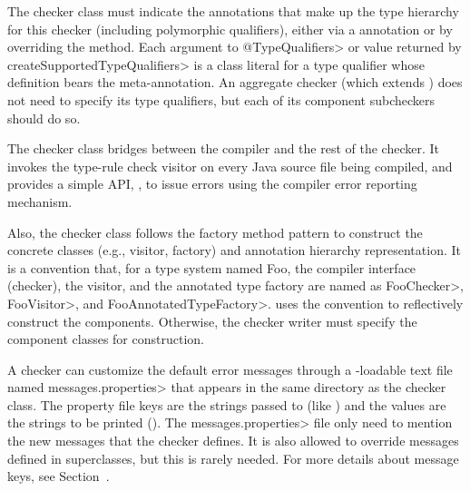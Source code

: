 The checker class must indicate the annotations
that make up the type hierarchy for this checker (including
polymorphic qualifiers), either via a
 annotation or by overriding
the
method.  Each argument to \<@TypeQualifiers> or value returned by
\<createSupportedTypeQualifiers> is a class literal for a type qualifier
whose definition bears the
 meta-annotation.
An aggregate checker (which extends
) does not need to specify its
type qualifiers, but each of its component subcheckers should do so.


The checker class bridges between the compiler and the rest of the checker.  It
invokes the type-rule check visitor on every Java source file being
compiled, and provides a simple API, , to issue
errors using the compiler error reporting mechanism.

Also, the checker class follows the factory method pattern to
construct the concrete classes (e.g., visitor, factory) and annotation
hierarchy representation.  It is a convention that, for
a type system named Foo, the compiler
interface (checker), the visitor, and the annotated type factory are
named as \<FooChecker>, \<FooVisitor>, and \<FooAnnotatedTypeFactory>.
 uses the convention to
reflectively construct the components.  Otherwise, the checker writer
must specify the component classes for construction.

\begin{sloppypar}
A checker can customize the default error messages through a
-loadable text file named
\<messages.properties> that appears in the same directory as the checker class.
The property file keys are the strings passed to 
(like ) and the values are the strings to be
printed ().
The \<messages.properties> file only need to mention the new messages that
the checker defines.
It is also allowed to override messages defined in superclasses, but this
is rarely needed.
For more details about message keys, see Section~.
\end{sloppypar}


